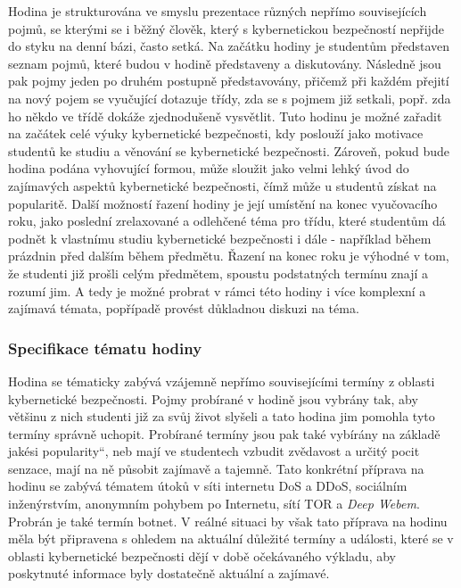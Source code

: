 \documentclass[a4paper, 12pt]{article}
\providecommand{\uv}[1]{\quotedblbase #1\textquotedblleft}
\begin{document}
Hodina je strukturována ve smyslu prezentace různých nepřímo souvisejících pojmů, se kterými se i běžný člověk, který s kybernetickou bezpečností nepřijde do styku na denní bázi, často setká. Na začátku hodiny je studentům představen seznam pojmů, které budou v hodině představeny a diskutovány. Následně jsou pak pojmy jeden po druhém postupně představovány, přičemž při každém přejití na nový pojem se vyučující dotazuje třídy, zda se s pojmem již setkali, popř. zda ho někdo ve třídě dokáže zjednodušeně vysvětlit. Tuto hodinu je možné zařadit na začátek celé výuky kybernetické bezpečnosti, kdy poslouží jako motivace studentů ke studiu a věnování se kybernetické bezpečnosti. Zároveň, pokud bude hodina podána vyhovující formou, může sloužit jako velmi lehký úvod do zajímavých aspektů kybernetické bezpečnosti, čímž může u studentů získat na popularitě. Další možností řazení hodiny je její umístění na konec vyučovacího roku, jako poslední zrelaxované a odlehčené téma pro třídu, které studentům dá podnět k vlastnímu studiu kybernetické bezpečnosti i dále - například během prázdnin před dalším během předmětu. Řazení na konec roku je výhodné v tom, že studenti již prošli celým předmětem, spoustu podstatných termínu znají a rozumí jim. A tedy je možné probrat v rámci této hodiny i více komplexní a zajímavá témata, popřípadě provést důkladnou diskuzi na téma.

\subsubsection{Specifikace tématu hodiny} 
Hodina se tématicky zabývá vzájemně nepřímo souvisejícími termíny z oblasti kybernetické bezpečnosti. Pojmy probírané v hodině jsou vybrány tak, aby většinu z nich studenti již za svůj život slyšeli a tato hodina jim pomohla tyto termíny správně uchopit. Probírané termíny jsou pak také vybírány na základě jakési \uv{popularity}, neb mají ve studentech vzbudit zvědavost a určitý pocit senzace, mají na ně působit zajímavě a tajemně. Tato konkrétní příprava na hodinu se zabývá tématem útoků v síti internetu DoS a DDoS, sociálním inženýrstvím, anonymním pohybem po Internetu, sítí TOR a \textit{Deep Webem}. Probrán je také termín botnet. V reálné situaci by však tato příprava na hodinu měla být připravena s ohledem na aktuální důležité termíny a události, které se v oblasti kybernetické bezpečnosti dějí v době očekávaného výkladu, aby poskytnuté informace byly dostatečně aktuální a zajímavé.
\end{document}
